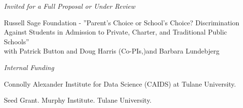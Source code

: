 \documentclass[letterpaper]{article}
\renewenvironment{itemize}{
  \begin{list}{}{
    \setlength{\leftmargin}{1.5em}
  }
}{
  \end{list}
}
\begin{document}
\textit{Invited for a Full Proposal or Under Review} \\
\begin{itemize}
  \item {} {}Russell Sage Foundation - ”Parent’s Choice or School’s Choice? Discrimination \\{\makebox[17mm]{\hfill}} Against Students in Admission to Private, Charter, and Traditional Public Schools” \\{\makebox[17mm]{\hfill}}  with Patrick Button and Doug Harris (Co-PIs,)and Barbara Lundebjerg\student
\end{itemize}

\vspace{2 mm}
\textit{Internal Funding} \\
\begin{itemize}
  \item {} {}Connolly Alexander Institute for Data Science (CAIDS) at Tulane University.
\end{itemize}
\vspace{2 mm}
\begin{itemize}
  \item {} {}Seed Grant. Murphy Institute. Tulane University.
\end{itemize}
\end{document}
